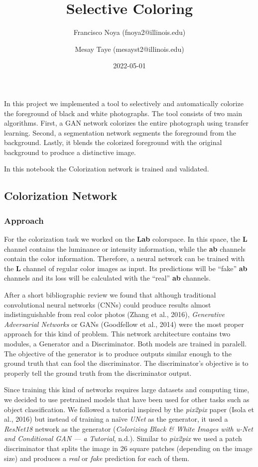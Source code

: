 \documentclass[
]{article}
\title{Selective Coloring}
\author{Francisco Noya (fnoya2@illinois.edu) \and Mesay Taye
(mesayst2@illinois.edu)}
\date{2022-05-01}
\begin{document}
\maketitle

In this project we implemented a tool to selectively and automatically
colorize the foreground of black and white photographs. The tool
consists of two main algorithms. First, a GAN network colorizes the
entire photograph using transfer learning. Second, a segmentation
network segments the foreground from the background. Lastly, it blends
the colorized foreground with the original background to produce a
distinctive image.

In this notebook the Colorization network is trained and validated.

\hypertarget{colorization-network}{%
\subsection{Colorization Network}\label{colorization-network}}

\hypertarget{approach}{%
\subsubsection{Approach}\label{approach}}

For the colorization task we worked on the \textbf{Lab} colorspace. In
this space, the \textbf{L} channel contains the luminance or intensity
information, while the \textbf{ab} channels contain the color
information. Therefore, a neural network can be trained with the
\textbf{L} channel of regular color images as input. Its predictions
will be ``fake'' \textbf{ab} channels and its loss will be calculated
with the ``real'' \textbf{ab} channels.

After a short bibliographic review we found that although traditional
convolutional neural networks (CNNs) could produce results almost
indistinguishable from real color photos (Zhang et al., 2016),
\emph{Generative Adversarial Networks} or GANs (Goodfellow et al., 2014)
were the most proper approach for this kind of problem. This network
architecture contains two modules, a Generator and a Discriminator. Both
models are trained in paralell. The objective of the generator is to
produce outputs similar enough to the ground truth that can fool the
discriminator. The discriminator's objective is to properly tell the
ground truth from the discriminator output.

Since training this kind of networks requires large datasets and
computing time, we decided to use pretrained models that have been used
for other tasks such as object classification. We followed a tutorial
inspired by the \emph{pix2pix} paper (Isola et al., 2016) but instead of
training a naïve \emph{UNet} as the generator, it used a \emph{ResNet18}
network as the generator (\emph{Colorizing Black \& White Images with
u-Net and Conditional GAN --- a Tutorial}, n.d.). Similar to
\emph{pix2pix} we used a patch discriminator that splits the image in 26
square patches (depending on the image size) and produces a \emph{real}
or \emph{fake} prediction for each of them.
\end{document}
